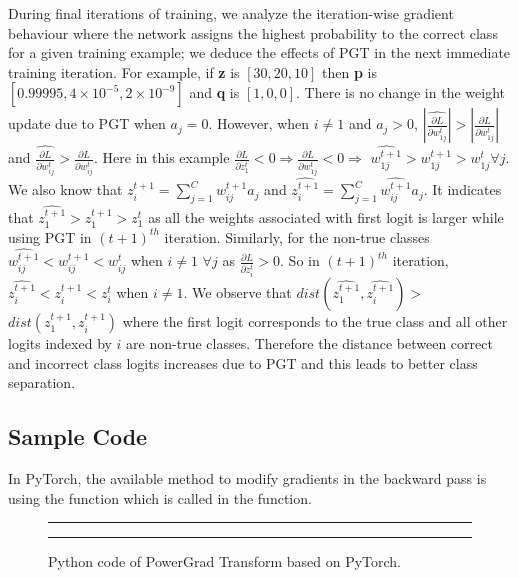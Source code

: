 \documentclass[runningheads]{llncs}
\begin{document}
During final iterations of training, we analyze the iteration-wise gradient behaviour
where the network assigns the highest probability to the correct class for a given
training example; we deduce the effects of PGT in the next immediate training iteration.
For example, if \textbf{z} is $[30, 20, 10]$ then \textbf{p} is $[0.99995, 4\times
10^{-5}, 2\times10^{-9}]$ and \textbf{q} is $[1, 0, 0]$. There is no change in the
weight update due to PGT when $a_j = 0$. However, when $i \neq 1$ and $a_j > 0$,
$|\widehat{\frac{\partial L}{\partial w_{1j}^{t}}}| > |\frac{\partial L}{\partial
w_{1j}^{t}}|$ and $\widehat{\frac{\partial L}{\partial w_{ij}^{t}}} > \frac{\partial
L}{\partial w_{ij}^{t}}$. Here in this example $\frac{\partial L}{\partial z_{1}^{t}} <
0 \Rightarrow \frac{\partial L}{\partial w_{1j}^{t}} < 0 \Rightarrow$
$\widehat{w_{1j}^{t+1}} > w_{1j}^{t+1} > w_{1j}^{t} \forall j$. We also know that
$z_i^{t+1} = \sum_{j=1}^{C}w_{ij}^{t+1}a_j$ and $\widehat{z_i^{t+1}} =
\sum_{j=1}^{C}\widehat{w_{ij}^{t+1}}a_j$. It indicates that $\widehat{z_{1}^{t+1}} >
z_{1}^{t+1} > z_{1}^{t}$ as all the weights associated with first logit is larger while
using PGT in $(t+1)^{th}$ iteration. Similarly, for the non-true classes
$\widehat{w_{ij}^{t+1}} < w_{ij}^{t+1} < w_{ij}^{t}$ when $i \neq 1$ $\forall j$ as
$\frac{\partial L}{\partial z_{i}^{t}} > 0$. So in $(t+1)^{th}$ iteration,
$\widehat{z_{i}^{t+1}} < z_{i}^{t+1} < z_{i}^{t}$ when $i \neq 1$. We observe that
$dist(\widehat{z_{1}^{t+1}}, \widehat{z_{i}^{t+1}}) > $  $dist(z_{1}^{t+1},
z_{i}^{t+1})$ where the first logit corresponds to the true class and all other logits
indexed by $i$ are non-true classes. Therefore the distance between correct and
incorrect class logits increases due to PGT and this leads to better class separation.

\subsection{Sample Code}

In PyTorch, the available method to modify gradients in the backward pass is using the
 function which is called in the  function.

\begin{figure}[ht] \hrule  \hrule
\vspace{0.25cm} \caption{Python code of PowerGrad Transform based on PyTorch. }
\label{fig:code}
\end{figure}
\end{document}
